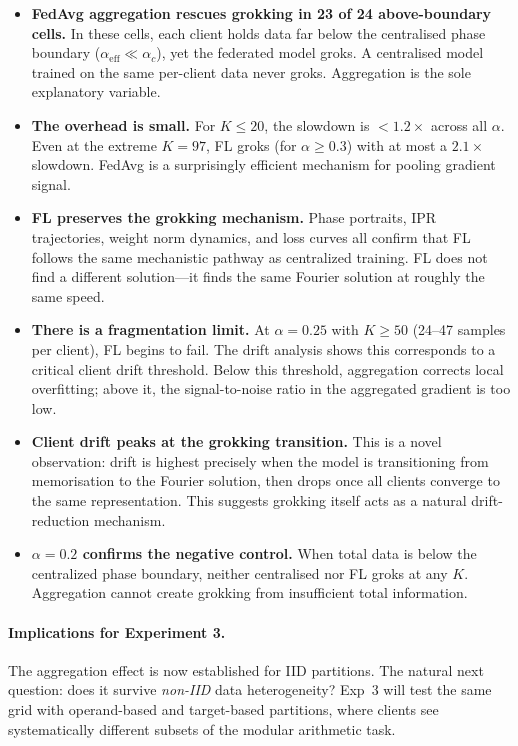 \documentclass[11pt]{article}
\begin{document}
\begin{itemize}[nosep]
  \item \textbf{FedAvg aggregation rescues grokking in 23 of 24 above-boundary cells.}
        In these cells, each client holds data far below the centralised phase
        boundary ($\alpha_{\text{eff}} \ll \alpha_c$), yet the federated model
        groks. A centralised model trained on the same per-client data never groks.
        Aggregation is the sole explanatory variable.

  \item \textbf{The overhead is small.}
        For $K \leq 20$, the slowdown is $< 1.2\times$ across all $\alpha$.
        Even at the extreme $K = 97$, FL groks (for $\alpha \geq 0.3$) with
        at most a $2.1\times$ slowdown. FedAvg is a surprisingly efficient
        mechanism for pooling gradient signal.

  \item \textbf{FL preserves the grokking mechanism.}
        Phase portraits, IPR trajectories, weight norm dynamics, and loss
        curves all confirm that FL follows the same mechanistic pathway as
        centralized training. FL does not find a different solution---it finds
        the same Fourier solution at roughly the same speed.

  \item \textbf{There is a fragmentation limit.}
        At $\alpha = 0.25$ with $K \geq 50$ (24--47 samples per client),
        FL begins to fail. The drift analysis shows this corresponds to a
        critical client drift threshold. Below this threshold, aggregation
        corrects local overfitting; above it, the signal-to-noise ratio in
        the aggregated gradient is too low.

  \item \textbf{Client drift peaks at the grokking transition.}
        This is a novel observation: drift is highest precisely when the model
        is transitioning from memorisation to the Fourier solution, then drops
        once all clients converge to the same representation. This suggests
        grokking itself acts as a natural drift-reduction mechanism.

  \item \textbf{$\alpha = 0.2$ confirms the negative control.}
        When total data is below the centralized phase boundary, neither
        centralised nor FL groks at any $K$. Aggregation cannot create
        grokking from insufficient total information.
\end{itemize}

\paragraph{Implications for Experiment 3.}
The aggregation effect is now established for IID partitions. The natural next
question: does it survive \emph{non-IID} data heterogeneity? Exp~3 will test
the same grid with operand-based and target-based partitions, where clients
see systematically different subsets of the modular arithmetic task.
\end{document}
